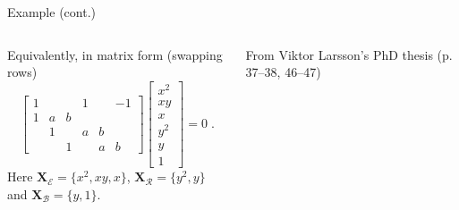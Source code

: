 \documentclass[aspectratio=169]{beamer}
\newcommand{\mat}[1]{\bm{#1}}
\newcommand{\XE}{\ensuremath{\mat{X}_\mathcal{E}}}
\newcommand{\XR}{\ensuremath{\mat{X}_\mathcal{R}}}
\newcommand{\XB}{\ensuremath{\mat{X}_\mathcal{B}}}
\begin{document}
\begin{frame}[t]{Example (cont.)}
\vspace{1cm}
\begin{columns}
    \begin{column}{0.7\textwidth}
        Equivalently, in matrix form (swapping rows)
        \begin{equation*}%
            \begin{bmatrix}
                1 &&&1&&-1 \\
                1&a&b\\
                &1&&a&b\\
                &&1&&a&b
            \end{bmatrix}
            \begin{bmatrix}
                x^2 \\ xy \\ x \\ y^2 \\ y \\ 1
            \end{bmatrix}
            = 0\;.
        \end{equation*}
    Here $\XE = \{x^2,xy,x\}$, $\XR=\{y^2,y\}$ and $\XB=\{y,1\}$.
    \end{column}%
    \begin{column}{0.3\textwidth}
        \centering
        

        \vspace{5mm}

        {\scriptsize From Viktor Larsson's PhD thesis (p. 37--38, 46--47)}
    \end{column}
\end{columns}
\end{frame}
\end{document}
